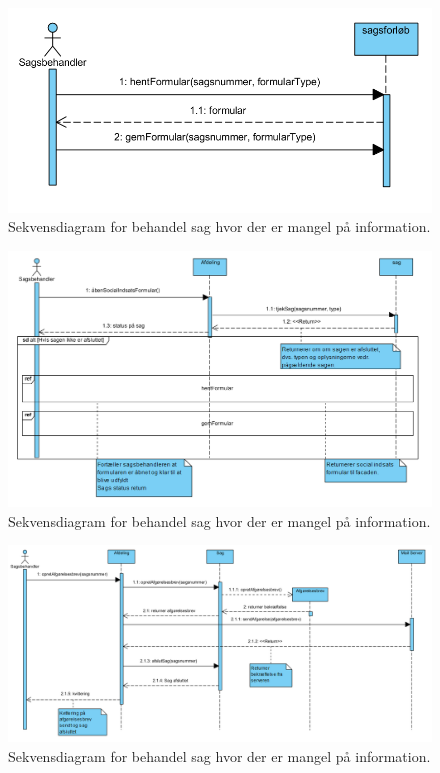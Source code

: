 \begin{figure}
  \includegraphics[width=\linewidth]{./PNG/sekDiaBehandelSagMangel.PNG} 
  \caption{Sekvensdiagram for behandel sag hvor der er mangel på information.}
  \label{fig:BSMangel}
\end{figure}

\begin{figure}
  \includegraphics[width=\linewidth]{./PNG/sekDiaAfgoereSagsbehandaaben.PNG} 
  \caption{Sekvensdiagram for behandel sag hvor der er mangel på information.}
  \label{fig:ASAA}
\end{figure}


\begin{figure}
  \includegraphics[width=\linewidth]{./PNG/sekDiaAfgoereSagsbehandAfgoerelse.PNG} 
  \caption{Sekvensdiagram for behandel sag hvor der er mangel på information.}
  \label{fig:ASAf}
\end{figure}

